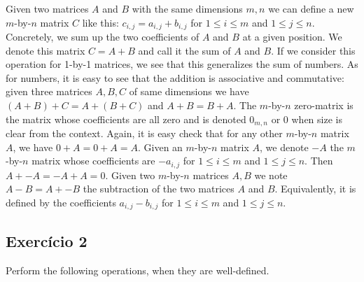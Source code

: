 Given two matrices $A$ and $B$ with the same dimensions
$m,n$ we can define a new $m$-by-$n$ matrix $C$ like this:
$c_{i,j} = a_{i,j} + b_{i,j}$ for $1\leq i \leq m$ and
$1\leq j \leq n$. Concretely, we sum up the two coefficients of
$A$ and $B$ at a given position. We denote this matrix $C=A+B$ and
call it the sum of $A$ and $B$. If we consider this operation for
1-by-1 matrices, we see that this generalizes the sum of numbers.
As for numbers, it is easy to see that the addition is associative
and commutative: given three matrices $A,B,C$ of same dimensions we have
$(A+B)+C = A+(B+C)$ and $A+B = B+A$.
The $m$-by-$n$ zero-matrix is the matrix whose coefficients are all
zero and is denoted $0_{m,n}$ or
$0$ when size is clear from the context.
Again, it is easy check that for any other $m$-by-$n$ matrix $A$,
we have $0 + A = 0 + A = A$. Given an
$m$-by-$n$ matrix $A$, we denote $-A$ the $m$-by-$n$
matrix whose coefficients are $-a_{i,j}$ for $1\leq i \leq m$ and
$1\leq j \leq n$. Then $A + -A = -A + A = 0$.
Given two $m$-by-$n$ matrices $A,B$ we note $A - B = A + -B$ the
subtraction of the two matrices $A$ and $B$. Equivalently,
it is defined by the coefficients
$a_{i,j} - b_{i,j}$ for $1\leq i \leq m$ and $1\leq j \leq n$.

\subsection*{Exercício 2}

Perform the following operations, when they are well-defined.

